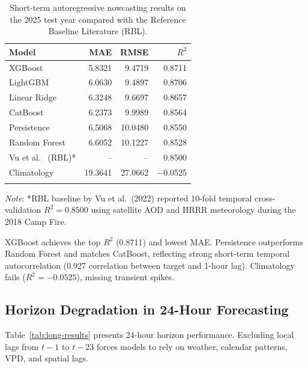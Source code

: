 \documentclass[pdflatex,sn-mathphys-num]{sn-jnl}
\begin{document}
\begin{table}[htbp]
\caption{Short-term autoregressive nowcasting results on the 2025 test year compared with the Reference Baseline Literature (RBL).}\label{tab:short-results}
\begin{tabular*}{\textwidth}{@{\extracolsep\fill}lrrr}
\toprule
Model & MAE & RMSE & $R^2$ \\
\midrule
XGBoost & 5.8321 & 9.4719 & 0.8711 \\
LightGBM & 6.0630 & 9.4897 & 0.8706 \\
Linear Ridge & 6.3248 & 9.6697 & 0.8657 \\
CatBoost & 6.2373 & 9.9989 & 0.8564 \\
Persistence & 6.5068 & 10.0480 & 0.8550 \\
Random Forest & 6.6052 & 10.1227 & 0.8528 \\
Vu et al.~\cite{vu2022geostationary} (RBL)* & -- & -- & 0.8500 \\
Climatology & 19.3641 & 27.0662 & $-$0.0525 \\
\botrule
\end{tabular*}
\begin{tablenotes}
\item \textit{Note}: *RBL baseline by Vu et al.\ (2022) reported 10-fold temporal cross-validation $R^2 = 0.8500$ using satellite AOD and HRRR meteorology during the 2018 Camp Fire.
\end{tablenotes}
\end{table}

XGBoost achieves the top $R^2$ (0.8711) and lowest MAE. Persistence outperforms Random Forest and matches CatBoost, reflecting strong short-term temporal autocorrelation (0.927 correlation between target and 1-hour lag). Climatology fails ($R^2 = -0.0525$), missing transient spikes.

\subsection{Horizon Degradation in 24-Hour Forecasting}\label{subsec:long-term}
Table~\ref{tab:long-results} presents 24-hour horizon performance. Excluding local lags from $t-1$ to $t-23$ forces models to rely on weather, calendar patterns, VPD, and spatial lags.
\end{document}

